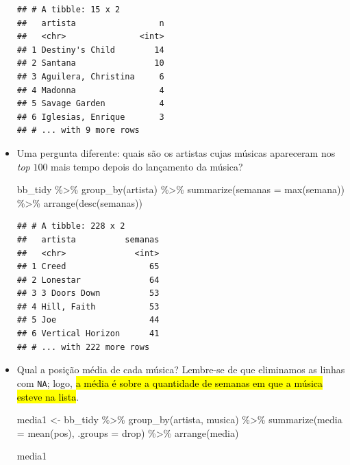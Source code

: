 \documentclass[
  11pt]{report}
\newenvironment{Shaded}{\begin{snugshade}}{\end{snugshade}}
\newcommand{\AttributeTok}[1]{\textcolor[rgb]{0.77,0.63,0.00}{#1}}
\newcommand{\FunctionTok}[1]{\textcolor[rgb]{0.00,0.00,0.00}{#1}}
\newcommand{\NormalTok}[1]{#1}
\newcommand{\OtherTok}[1]{\textcolor[rgb]{0.56,0.35,0.01}{#1}}
\newcommand{\SpecialCharTok}[1]{\textcolor[rgb]{0.00,0.00,0.00}{#1}}
\newcommand{\StringTok}[1]{\textcolor[rgb]{0.31,0.60,0.02}{#1}}
\renewenvironment{Shaded}{
    \begin{mdframed}[%
      roundcorner=2pt,%
      innerleftmargin=5pt,%
      innerrightmargin=5pt,%
      topline=true,%
      leftline=true,%
      rightline=true,%
      bottomline=true,%
      linewidth=0.5pt,%
      linecolor=black!20,%
      backgroundcolor=black!2,%
      skipabove=2ex,%
      skipbelow=2.5ex%
    ]%
  }
  {
    \end{mdframed}
  }
\begin{document}
\begin{itemize}
\begin{verbatim}
## # A tibble: 15 x 2
##   artista                 n
##   <chr>               <int>
## 1 Destiny's Child        14
## 2 Santana                10
## 3 Aguilera, Christina     6
## 4 Madonna                 4
## 5 Savage Garden           4
## 6 Iglesias, Enrique       3
## # ... with 9 more rows
\end{verbatim}
\item
  Uma pergunta diferente: quais são os artistas cujas músicas apareceram nos \emph{top} $100$ mais tempo depois do lançamento da música?

\begin{Shaded}
\begin{Highlighting}[]
\NormalTok{bb\_tidy }\SpecialCharTok{\%\textgreater{}\%} 
  \FunctionTok{group\_by}\NormalTok{(artista) }\SpecialCharTok{\%\textgreater{}\%} 
  \FunctionTok{summarize}\NormalTok{(}\AttributeTok{semanas =} \FunctionTok{max}\NormalTok{(semana)) }\SpecialCharTok{\%\textgreater{}\%} 
  \FunctionTok{arrange}\NormalTok{(}\FunctionTok{desc}\NormalTok{(semanas))}
\end{Highlighting}
\end{Shaded}

\begin{verbatim}
## # A tibble: 228 x 2
##   artista          semanas
##   <chr>              <int>
## 1 Creed                 65
## 2 Lonestar              64
## 3 3 Doors Down          53
## 4 Hill, Faith           53
## 5 Joe                   44
## 6 Vertical Horizon      41
## # ... with 222 more rows
\end{verbatim}
\item
  Qual a posição média de cada música? Lembre-se de que eliminamos as linhas com \texttt{NA}; logo, {\hl{a média é sobre a quantidade de semanas em que a música esteve na lista}}.

\begin{Shaded}
\begin{Highlighting}[]
\NormalTok{media1 }\OtherTok{\textless{}{-}}\NormalTok{ bb\_tidy }\SpecialCharTok{\%\textgreater{}\%} 
  \FunctionTok{group\_by}\NormalTok{(artista, musica) }\SpecialCharTok{\%\textgreater{}\%} 
  \FunctionTok{summarize}\NormalTok{(}\AttributeTok{media =} \FunctionTok{mean}\NormalTok{(pos), }\AttributeTok{.groups =} \StringTok{\textquotesingle{}drop\textquotesingle{}}\NormalTok{) }\SpecialCharTok{\%\textgreater{}\%} 
  \FunctionTok{arrange}\NormalTok{(media)}

\NormalTok{media1}
\end{Highlighting}
\end{Shaded}


\end{itemize}
\end{document}
